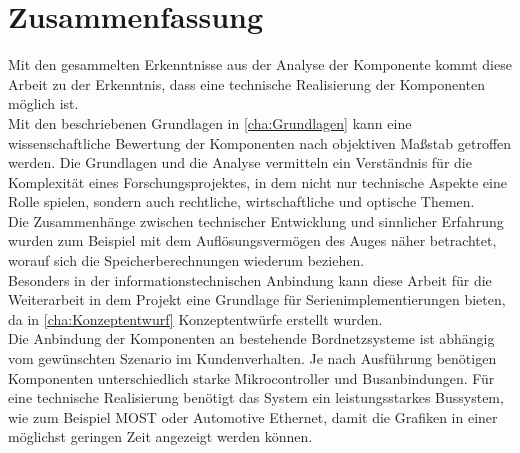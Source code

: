 \chapter{Zusammenfassung}
\label{cha:zusammenfassung}
Mit den gesammelten Erkenntnisse aus der Analyse der Komponente kommt diese Arbeit zu der Erkenntnis, dass eine technische Realisierung der Komponenten möglich ist. \\
Mit den beschriebenen Grundlagen in \ref{cha:Grundlagen} kann eine wissenschaftliche Bewertung der Komponenten nach objektiven Maßstab getroffen werden. Die Grundlagen und die Analyse vermitteln ein Verständnis für die Komplexität eines Forschungsprojektes, in dem nicht nur technische Aspekte eine Rolle spielen, sondern auch rechtliche, wirtschaftliche und optische Themen. \\
Die Zusammenhänge zwischen technischer Entwicklung und sinnlicher Erfahrung wurden zum Beispiel mit dem Auflösungsvermögen des Auges näher betrachtet, worauf sich die Speicherberechnungen wiederum beziehen. \\
Besonders in der informationstechnischen Anbindung kann diese Arbeit für die Weiterarbeit in dem Projekt eine Grundlage für Serienimplementierungen bieten, da in \ref{cha:Konzeptentwurf} Konzeptentwürfe erstellt wurden. \\
Die Anbindung der Komponenten an bestehende Bordnetzsysteme ist abhängig vom gewünschten Szenario im Kundenverhalten. Je nach Ausführung benötigen Komponenten unterschiedlich starke Mikrocontroller und Busanbindungen.
Für eine technische Realisierung benötigt das System ein leistungsstarkes Bussystem, wie zum Beispiel MOST oder Automotive Ethernet, damit die Grafiken in einer möglichst geringen Zeit angezeigt werden können. 
